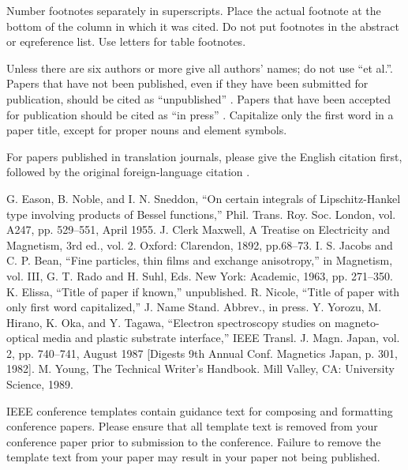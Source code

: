 \documentclass[conference]{IEEEtran}
\begin{document}
Number footnotes separately in superscripts. Place the actual footnote at 
the bottom of the column in which it was cited. Do not put footnotes in the 
abstract or eqreference list. Use letters for table footnotes.

Unless there are six authors or more give all authors' names; do not use 
``et al.''. Papers that have not been published, even if they have been 
submitted for publication, should be cited as ``unpublished'' \cite{b4}. Papers 
that have been accepted for publication should be cited as ``in press'' \cite{b5}. 
Capitalize only the first word in a paper title, except for proper nouns and 
element symbols.

For papers published in translation journals, please give the English 
citation first, followed by the original foreign-language citation \cite{b6}.

\begin{thebibliography}{00}
 G. Eason, B. Noble, and I. N. Sneddon, ``On certain integrals of Lipschitz-Hankel type involving products of Bessel functions,'' Phil. Trans. Roy. Soc. London, vol. A247, pp. 529--551, April 1955.
 J. Clerk Maxwell, A Treatise on Electricity and Magnetism, 3rd ed., vol. 2. Oxford: Clarendon, 1892, pp.68--73.
 I. S. Jacobs and C. P. Bean, ``Fine particles, thin films and exchange anisotropy,'' in Magnetism, vol. III, G. T. Rado and H. Suhl, Eds. New York: Academic, 1963, pp. 271--350.
 K. Elissa, ``Title of paper if known,'' unpublished.
 R. Nicole, ``Title of paper with only first word capitalized,'' J. Name Stand. Abbrev., in press.
 Y. Yorozu, M. Hirano, K. Oka, and Y. Tagawa, ``Electron spectroscopy studies on magneto-optical media and plastic substrate interface,'' IEEE Transl. J. Magn. Japan, vol. 2, pp. 740--741, August 1987 [Digests 9th Annual Conf. Magnetics Japan, p. 301, 1982].
 M. Young, The Technical Writer's Handbook. Mill Valley, CA: University Science, 1989.
\end{thebibliography}
\vspace{12pt}
\color{red}
IEEE conference templates contain guidance text for composing and formatting conference papers. Please ensure that all template text is removed from your conference paper prior to submission to the conference. Failure to remove the template text from your paper may result in your paper not being published.
\end{document}
